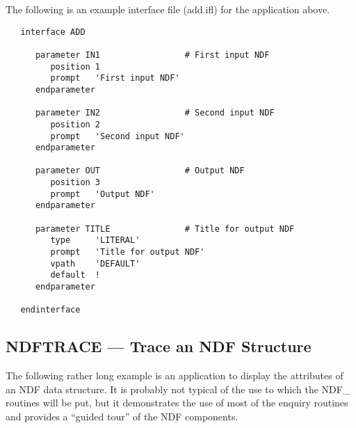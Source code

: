 The following is an example  interface file
(add.ifl) for the application above. 

\small
\begin{verbatim}
   interface ADD

      parameter IN1                 # First input NDF
         position 1
         prompt   'First input NDF'
      endparameter

      parameter IN2                 # Second input NDF
         position 2
         prompt   'Second input NDF'
      endparameter

      parameter OUT                 # Output NDF
         position 3
         prompt   'Output NDF'
      endparameter

      parameter TITLE               # Title for output NDF
         type     'LITERAL'
         prompt   'Title for output NDF'
         vpath    'DEFAULT'
         default  !
      endparameter

   endinterface
\end{verbatim}
\normalsize

\newpage
\subsection{\label{ss:tracingndf}NDFTRACE --- Trace an NDF Structure}

The following rather long example is an application to display the attributes of
an NDF data structure. 
It is probably not typical of the use to which the NDF\_ routines will be
put, but it demonstrates the use of most of the enquiry routines and
provides a ``guided tour'' of the NDF components.

